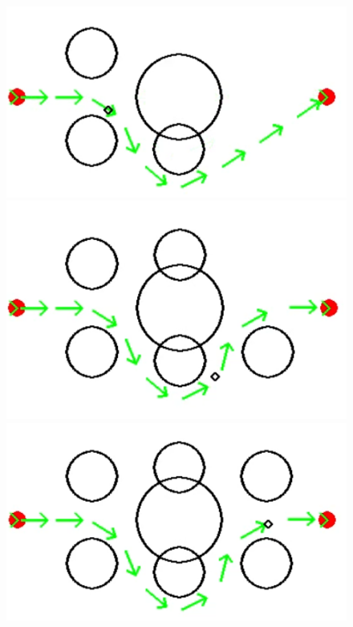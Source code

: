  \begin{figure}[!htb]
    \centering
    \begin{minipage}[b]{.3\linewidth}
        \centering
        \includegraphics[width=0.9\linewidth]{Figures/07_simulation/lidar/lidar4.png}
    \end{minipage}%
    \hfill%
    \begin{minipage}[b]{.3\linewidth}
        \centering
        \includegraphics[width=0.9\linewidth]{Figures/07_simulation/lidar/lidar5.png}
    \end{minipage}%
    \hfill%
    \begin{minipage}[b]{.3\linewidth}
        \centering
        \includegraphics[width=0.9\linewidth]{Figures/07_simulation/lidar/lidar6.png}

\end{minipage}
\end{figure}
